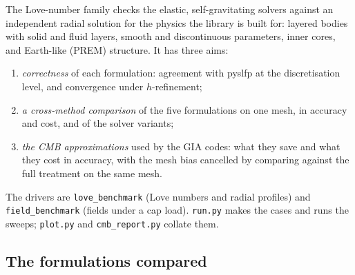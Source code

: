 \documentclass[11pt]{article}
\numberwithin{equation}{section}
\newcommand{\code}[1]{\texttt{#1}}
\begin{document}
The Love-number family checks the elastic, self-gravitating solvers
against an independent radial solution for the physics the library is
built for: layered bodies with solid and fluid layers, smooth and
discontinuous parameters, inner cores, and Earth-like (PREM) structure.
It has three aims:
\begin{enumerate}[leftmargin=*]
\item \emph{correctness} of each formulation: agreement with pyslfp at the
  discretisation level, and convergence under $h$-refinement;
\item \emph{a cross-method comparison} of the five formulations on one
  mesh, in accuracy and cost, and of the solver variants;
\item \emph{the CMB approximations} used by the GIA codes: what they
  save and what they cost in accuracy, with the mesh bias cancelled by
  comparing against the full treatment on the same mesh.
\end{enumerate}
The drivers are \code{love\_benchmark} (Love numbers and radial profiles)
and \code{field\_benchmark} (fields under a cap load). \code{run.py}
makes the cases and runs the sweeps; \code{plot.py} and
\code{cmb\_report.py} collate them.

\subsection{The formulations compared}
\label{sec:formulations}
\end{document}
